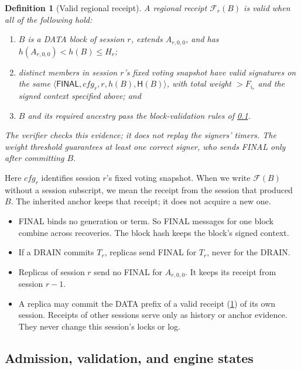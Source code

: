 \documentclass[11pt,a4paper]{article}
\newcommand{\FC}{\mathcal F}
\newcommand{\Hash}{\mathsf H}
\newcommand{\tagg}[1]{\ensuremath{\mathsf{#1}}}
\newtheorem{definition}{Definition}[section]
\begin{document}
\begin{definition}[Valid regional receipt]
\label{def:receipt}
A regional receipt $\FC_r(B)$ is valid when all of the following hold:
\begin{enumerate}[label=(\roman*)]
\item $B$ is a DATA block of session $r$, extends $A_{r,0,0}$, and has
$h(A_{r,0,0})<h(B)\le H_r$;
\item distinct members in session $r$'s fixed voting snapshot have
valid signatures on the same
$\langle\tagg{FINAL},\mathit{cfg}_r,r,h(B),\Hash(B)\rangle$,
with total weight $>F_{i_r}$ and the signed context specified above; and
\item $B$ and its required ancestry pass the block-validation rules of
\cref{sec:admission}.
\end{enumerate}
The verifier checks this evidence; it does not replay the signers'
timers. The weight threshold guarantees at least one correct signer,
who sends FINAL only after committing $B$.
\end{definition}
Here $\mathit{cfg}_r$ identifies session $r$'s fixed voting snapshot.
When we write $\FC(B)$ without a session subscript, we mean the receipt
from the session that produced $B$. The inherited anchor keeps that
receipt; it does not acquire a new one.
\begin{itemize}
\item FINAL binds no generation or term. So FINAL messages for one block
combine across recoveries. The block hash keeps the block's signed
context.
\item If a DRAIN commits $T_r$, replicas send FINAL for $T_r$, never for
the DRAIN.
\item Replicas of session $r$ send no FINAL for $A_{r,0,0}$. It keeps its
receipt from session $r-1$.
\item A replica may commit the DATA prefix of a valid receipt
(\cref{def:receipt}) of its own session. Receipts of other sessions serve only as history or anchor
evidence. They never change this session's locks or log.
\end{itemize}

\subsection{Admission, validation, and engine states}
\label{sec:admission}
\end{document}
